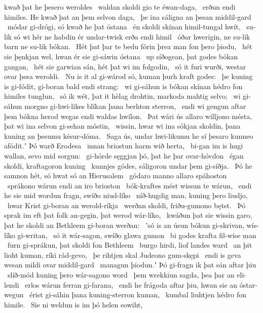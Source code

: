 kwað þat he þesero weroldes \hld\ waldan skoldi
gio te éwan-daga, \hld\ erðun endi himiles.
He kwað þat an þem selvon daga, \hld\ þe ina sáligna
an þesan middil-gard \hld\ módar gi-drógi,
só kwað he þat óstana \hld\ én skoldi skínan
himil-tungal hwít, \hld\ su-lik só wi hér ne habdin ér
undar-twisk erða endi himil \hld\ óðar hwerigin,
ne su-lik barn ne su-lik bókan. \hld\ Hét þat þar te bedu fórin
þrea man fon þero þiodu, \hld\ hét sie þęnkjan wel,
hwan ér sie gi-sáwin óstana \hld\ up síðogean,
þat godes bókan gangan, \hld\ hét sie garwian sán,
hét þat wi im folgodin, \hld\ só it furi wurði,
westar ovar þesa weroldi. \hld\ Nu is it al gi-wárod só,
kuman þurh kraft godes: \hld\ þe kuning is gi-fódit,
gi-boran bald endi strang: \hld\ wi gi-sáhun is bókan skínan
hédro fon himiles tunglun, \hld\ só ik wét, þat it hèlag drohtin,
markoda mahtig selvo; \hld\ wi gi-sáhun morgno gi-hwi-likes
blíkan þana berhton sterron, \hld\ endi wi gengun aftar þem bókna herod
wegas endi waldas hwílon. \hld\ Þat wári ús allaro willjono mésta,
þat wi ina selvon gi-sehan móstin, \hld\ wissin, hwar wi ina sókjan skoldin,
þana kuning an þesumu késur-dóma. \hld\ Saga ús, undar hwi-likumu he sí þesaro kunneo afódit.ʼ
Þó warð Erodesa \hld\ innan briostun
harm wið herta, \hld\ bi-gan im is hugi wallan,
sevo mid sorgun: \hld\ gi-hórde sęggjan þó,
þat he þar ovar-hóvdon \hld\ égan skoldi,
kraftagoron kuning \hld\ kunnjes gódes,
sáligoron undar þem gi-síðja. \hld\ Þó he samnon hét,
só hwat só an Hierusalem \hld\ gódaro manno
allaro spáhoston \hld\ sprákono wárun
endi an iro brioston \hld\ bók-kraftes mést
wissun te wárun, \hld\ endi he sie mid wordun fragn,
swíðo niud-líko \hld\ níð-hugdig man,
kuning þero liudjo, \hld\ hwar Krist gi-boran
an werold-ríkja \hld\ werðan skoldi,
friðu-gumono bętst. \hld\ Þó sprak im eft þat folk an-gegin,
þat werod wár-líko, \hld\ kwáðun þat sie wissin garo,
þat he skoldi an Bethleem gi-boran werðan: \hld\ ʽsó is an úsun bókun gi-skrivan,
wís-líko gi-writan, \hld\ só it wár-sagon,
swíðo glawa gumon \hld\ bi godes krafta
fil-wíse man \hld\ furn gi-sprákun,
þat skoldi fon Bethleem \hld\ burgo hirdi,
liof landes ward \hld\ an þit lioht kuman,
ríki rád-gevo, \hld\ þe rihtjen skal
Judeono gum-skępi \hld\ endi is geva wesan
mildi ovar middil-gard \hld\ managun þiodun.ʼ
Þó gi-fragn ik þat sán aftar þiu \hld\ slíð-mód kuning
þero wár-sagono word \hld\ þem wrekkiun sagda,
þea þar an eli-lendi \hld\ erlos wárun
ferran gi-farana, \hld\ endi he frágoda aftar þiu,
hwan sie an óstar-wegun \hld\ érist gi-sáhin
þana kuning-sterron kuman, \hld\ kumbal liuhtjen
hédro fon himile. \hld\ Sie ni weldun is im þó helen eowiht,
